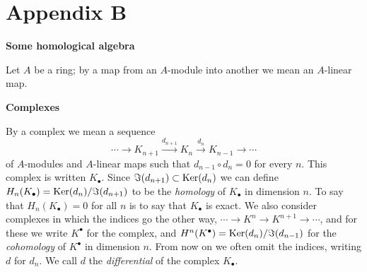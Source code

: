 \chapter*{Appendix B}
\renewcommand{\thetheorem}{B\arabic{theorem}}
\setcounter{theorem}{0}

\vspace*{-0.5cm}
\begin{center}
  {\Large\bfseries Some homological algebra}
\end{center}
\vspace{0.3cm}

Let $A$ be a ring; by a map from an $A$-module into another we mean an
$A$-linear map.

\medskip
\noindent\textbf{Complexes}

By a complex we mean a sequence
\[
  \cdots \to K_{n+1} \xrightarrow{d_{n+1}} K_n \xrightarrow{d_n} K_{n-1} \to \cdots
\]
of $A$-modules and $A$-linear maps such that $d_{n-1} \circ d_n = 0$ for every $n$.
This complex is written $K_\bullet$. Since $\Im(d_{n+1}) \subset \operatorname{Ker}(d_n)$ we can define
$H_n(K_\bullet) = \operatorname{Ker}(d_n)/\Im(d_{n+1})$ to be the \emph{homology} of $K_\bullet$ in dimension $n$. To
say that $H_n(K_\bullet) = 0$ for all $n$ is to say that $K_\bullet$ is exact. We also consider
complexes in which the indices go the other way, $\cdots \to K^n \to K^{n+1} \to \cdots$,
and for these we write $K^\bullet$ for the complex, and
$H^n(K^\bullet) = \operatorname{Ker}(d_n)/\Im(d_{n-1})$ for the \emph{cohomology} of $K^\bullet$ in dimension $n$.
From now on we often omit the indices, writing $d$ for $d_n$. We call $d$ the
\emph{differential} of the complex $K_\bullet$.

